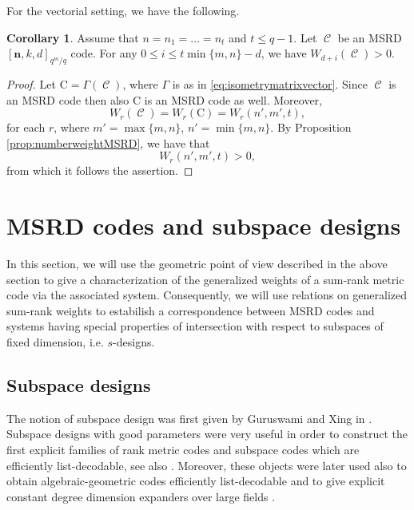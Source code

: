 \documentclass[11pt]{amsart}
\DeclareMathOperator{\C}{\mathcal{C}}
\theoremstyle{definition}
\newtheorem{corollary}[theorem]{Corollary}
\newcommand{\bfn}{\mathbf {n}}
\newcommand{\Fmnkd}{[\bfn,k,d]_{q^m/q}}
\begin{document}
For the vectorial setting, we have the following.

\begin{corollary} \label{cor:numberweightMSRDvector}
    Assume that $n=n_1=\ldots=n_t$ and $t\leq q-1$. Let $\C$ be an MSRD $\Fmnkd$ code.  For any $0 \leq i \leq t\min\{m,n\}-d$, we have $W_{d+i}(\C)>0$.
\end{corollary}
\begin{proof}
 Let $\mathrm{C}= \Gamma(\C)$, where $\Gamma$ is as in \eqref{eq:isometrymatrixvector}. Since $\C$ is an MSRD code then also $\mathrm{C}$ is an MSRD code as well. Moreover,
 \[
 W_r(\C)=W_r(\mathrm{C})=W_r(n',m',t),
 \]
 for each $r$, where $m'=\max\{m,n\}$, $n'=\min\{m,n\}$. By Proposition \ref{prop:numberweightMSRD}, we have that \[W_r(n',m',t)>0,\] from which it follows the assertion. 
\end{proof}





\section{MSRD codes and subspace designs}\label{sec:designs}


In this section, we will use the geometric point of view described in the above section to give a characterization of the generalized weights of a sum-rank metric code via the associated system. Consequently, we will use relations on generalized sum-rank weights to estabilish 
a correspondence between MSRD codes and systems having special properties of intersection with respect to subspaces of fixed dimension, i.e. $s$-designs.

\subsection{Subspace designs}

The notion of subspace design was first given by Guruswami and Xing in \cite{guruswami2016explicit}. Subspace designs with good parameters were very useful in order to construct the first explicit families of rank metric codes and subspace codes which are efficiently list-decodable, see also \cite{guruswami2011linear}. Moreover, these objects were later used also to obtain
algebraic-geometric codes efficiently list-decodable \cite{guruswami2017optimal} and to give explicit constant degree dimension expanders over large fields \cite{guruswami2021lossless}.
\end{document}
